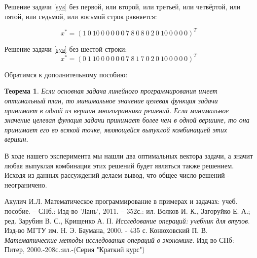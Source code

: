 \documentclass{article}
\newtheorem{theorem}{Теорема}
\begin{document}
\noindent Решение задачи \eqref{sys} без первой, или второй, или третьей, или четвёртой, или пятой, или седьмой, или восьмой строк равняется:

$$x^{*} = (1~0~10~0~0~0~0~0~7~8~0~8~0~2~0~10~0~0~0~0)^T$$

\noindent Решение задачи \eqref{sys} без шестой строки:
$$x^{*} = (0~1~10~0~0~0~0~0~7~8~1~7~0~2~0~10~0~0~0~0)^T$$

\noindent Обратимся к дополнительному пособию:
\begin{theorem}
Если основная задача линейного программирования имеет оптимальный план, то
минимальное значение целевая функция задачи принимает в одной из вершин многогранника решений. Если минимальное значение целевая функция задачи принимает
более чем в одной вершине, то она принимает его во всякой точке, являющейся
выпуклой комбинацией этих вершин.
\end{theorem}

\noindent В ходе нашего эксперимента мы нашли два оптимальных вектора задачи, а значит любая выпуклая комбинация этих решений будет являться также решением. Исходя из данных рассуждений делаем вывод, что общее число решений - неограничено. 

\begin{thebibliography}{9}
 Акулич И.Л. Математическое программирование в примерах и задачах: учеб. пособие. -- СПб.: Изд-во 'Лань', 2011. -- 352с.: ил.
Волков И. К., Загоруйко Е. А.; ред. Зарубин В. С., Крищенко А. П. 
\textit{Исследование операций: учебник для втузов}. 
Изд-во МГТУ им. Н. Э. Баумана, 2000. - 435 с. 
Конюховский П. В.
\textit{Математические методы исследования операций в экономике}.
Изд-во СПб: Питер, 2000.-208с.:ил.-(Серия "Краткий курс")
\end{thebibliography}
\end{document}
